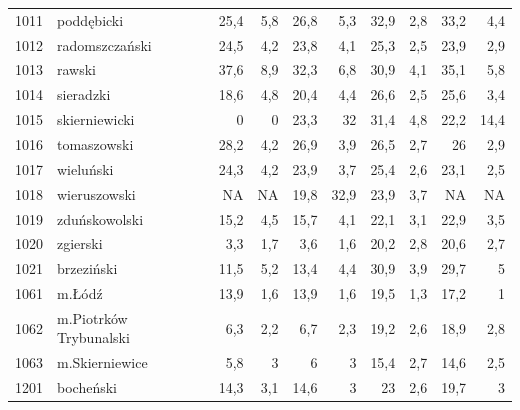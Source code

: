 \begin{center}
\begin{longtable}{lp{3cm}rrrrrrrr}
1011 & poddębicki              & 25,4    & 5,8         & 26,8     & 5,3          & 32,9     & 2,8          & 33,2     & 4,4          \\
1012 & radomszczański          & 24,5    & 4,2         & 23,8     & 4,1          & 25,3     & 2,5          & 23,9     & 2,9          \\
1013 & rawski                  & 37,6    & 8,9         & 32,3     & 6,8          & 30,9     & 4,1          & 35,1     & 5,8          \\
1014 & sieradzki               & 18,6    & 4,8         & 20,4     & 4,4          & 26,6     & 2,5          & 25,6     & 3,4          \\
1015 & skierniewicki           & 0       & 0           & 23,3     & 32           & 31,4     & 4,8          & 22,2     & 14,4         \\
1016 & tomaszowski             & 28,2    & 4,2         & 26,9     & 3,9          & 26,5     & 2,7          & 26       & 2,9          \\
1017 & wieluński               & 24,3    & 4,2         & 23,9     & 3,7          & 25,4     & 2,6          & 23,1     & 2,5          \\
1018 & wieruszowski            & NA      & NA          & 19,8     & 32,9         & 23,9     & 3,7          & NA       & NA           \\
1019 & zduńskowolski           & 15,2    & 4,5         & 15,7     & 4,1          & 22,1     & 3,1          & 22,9     & 3,5          \\
1020 & zgierski                & 3,3     & 1,7         & 3,6      & 1,6          & 20,2     & 2,8          & 20,6     & 2,7          \\
1021 & brzeziński              & 11,5    & 5,2         & 13,4     & 4,4          & 30,9     & 3,9          & 29,7     & 5            \\
1061 & m.Łódź                  & 13,9    & 1,6         & 13,9     & 1,6          & 19,5     & 1,3          & 17,2     & 1            \\
1062 & m.Piotrków Trybunalski  & 6,3     & 2,2         & 6,7      & 2,3          & 19,2     & 2,6          & 18,9     & 2,8          \\
1063 & m.Skierniewice          & 5,8     & 3           & 6        & 3            & 15,4     & 2,7          & 14,6     & 2,5          \\
1201 & bocheński               & 14,3    & 3,1         & 14,6     & 3            & 23       & 2,6          & 19,7     & 3            \\

\end{longtable}
\end{center}
